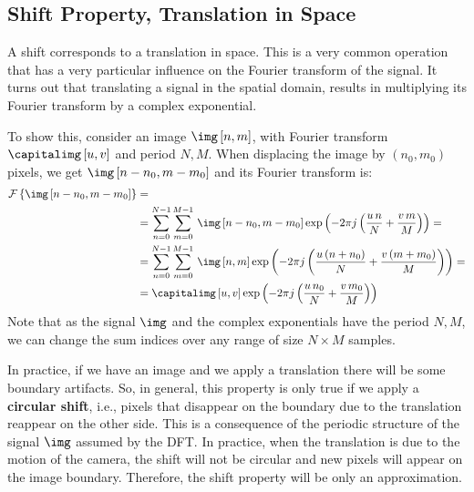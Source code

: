 \subsection{Shift Property, Translation in Space}

A shift corresponds to a translation in space. This is a very common operation that has a very particular influence on the Fourier transform of the signal. It turns out that translating a signal in the spatial domain, results in multiplying its Fourier transform by a complex exponential.

To show this, consider an image $\img \left[n,m \right]$, with Fourier transform $\capitalimg \left[u,v \right]$ and period $N,M$. When displacing the image by $(n_0, m_0)$ pixels, we get $\img \left[n-n_0,m-m_0 \right]$ and its Fourier transform is:
\begin{equation}
	\label{eq:shift}
	\begin{split}
		\mathcal{F} \left\{ \img\left[n-n_0,m-m_0 \right] \right\}
		 & =                                                                                                                                                            \\
		 & = \sum_{n=0}^{N-1} \sum_{m=0}^{M-1} \, \img \left[n-n_0,m-m_0 \right] \exp{ \left( -2\pi j \left( \frac{u\, n}{N} + \frac{v\, m}{M} \right) \right)} =       \\
		 & =  \sum_{n=0}^{N-1} \sum_{m=0}^{M-1} \, \img \left[n,m \right] \exp{ \left( -2\pi j \left( \frac{u\, (n+n_0)}{N} + \frac{v\, (m+m_0)}{M} \right) \right)}  = \\
		 & =   \capitalimg \left[u,v \right]  \exp{ \left( -2\pi j \left( \frac{u\, n_0}{N} + \frac{v\, m_0}{M} \right) \right)}
	\end{split}
\end{equation}
Note that as the signal $\img$ and the complex exponentials have the period $N,M$, we can change the sum indices over any range of size $N \times M$ samples.

In practice, if we have an image and we apply a translation there will be some boundary artifacts. So, in general, this property is only true if we apply a {\bf circular shift}, i.e., pixels that disappear on the boundary due to the translation reappear on the other side. This is a consequence of the periodic structure of the signal $\img$ assumed by the DFT. In practice, when the translation is due to the motion of the camera, the shift will not be circular and new pixels will appear on the image boundary. Therefore, the shift property will be only an approximation.


